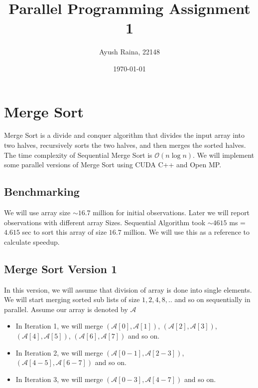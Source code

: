 \documentclass{article}
\title{Parallel Programming Assignment 1}
\author{Ayush Raina, 22148}
\date{\today}
\begin{document}
\maketitle

\section*{Merge Sort}
Merge Sort is a divide and conquer algorithm that divides the input array into two halves, recursively sorts the two halves, and then merges the sorted halves. The time complexity of Sequential Merge Sort is $\mathcal{O}(n \log n)$. We will implement some parallel versions of Merge Sort using CUDA C++ and Open MP. 

\subsection*{Benchmarking}
We will use array size $\sim 16.7$ million for initial observations. Later we will report observations with different array Sizes. Sequential Algorithm took $\sim 4615$ ms = $4.615$ sec to sort this array of size $16.7$ million. We will use this as a reference to calculate speedup.

\subsection*{Merge Sort Version 1}
In this version, we will assume that division of array is done into single elements. We will start merging sorted sub lists of size $1,2,4,8,..$ and so on sequentially in parallel. Assume our array is denoted by $\mathcal{A}$

\begin{itemize}
  \item In Iteration 1, we will merge $(\mathcal{A}[0], \mathcal{A}[1])$, $(\mathcal{A}[2], \mathcal{A}[3])$, $(\mathcal{A}[4], \mathcal{A}[5])$, $(\mathcal{A}[6], \mathcal{A}[7])$ and so on.
  \item In Iteration 2, we will merge $(\mathcal{A}[0-1], \mathcal{A}[2-3])$, $(\mathcal{A}[4-5], \mathcal{A}[6-7])$ and so on.
  \item In Iteration 3, we will merge $(\mathcal{A}[0-3], \mathcal{A}[4-7])$ and so on.
\end{itemize}

\end{document}
